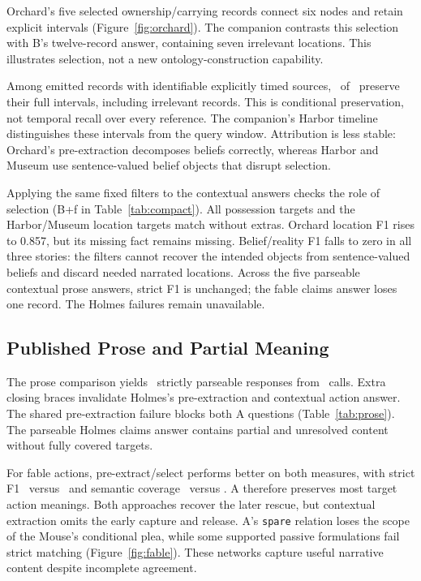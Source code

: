 \documentclass[a4paper,twoside]{article}
\begin{document}


Orchard's five selected ownership/carrying records connect six nodes and retain explicit intervals (Figure~\ref{fig:orchard}). The companion contrasts this selection with B's twelve-record answer, containing seven irrelevant locations. This illustrates selection, not a new ontology-construction capability.

Among emitted records with identifiable explicitly timed sources, \IntervalsKept\ of \IntervalsEligible\ preserve their full intervals, including irrelevant records. This is conditional preservation, not temporal recall over every reference. The companion's Harbor timeline distinguishes these intervals from the query window. Attribution is less stable: Orchard's pre-extraction decomposes beliefs correctly, whereas Harbor and Museum use sentence-valued belief objects that disrupt selection.

Applying the same fixed filters to the contextual answers checks the role of selection (B+f in Table~\ref{tab:compact}). All possession targets and the Harbor/Museum location targets match without extras. Orchard location F1 rises to 0.857, but its missing fact remains missing. Belief/reality F1 falls to zero in all three stories: the filters cannot recover the intended objects from sentence-valued beliefs and discard needed narrated locations. Across the five parseable contextual prose answers, strict F1 is unchanged; the fable claims answer loses one record. The Holmes failures remain unavailable.




\subsection{Published Prose and Partial Meaning}
\noindent The prose comparison yields \ProseParsed\ strictly parseable responses from \ProseCalls\ calls. Extra closing braces invalidate Holmes's pre-extraction and contextual action answer. The shared pre-extraction failure blocks both A questions (Table~\ref{tab:prose}). The parseable Holmes claims answer contains partial and unresolved content without fully covered targets.



For fable actions, pre-extract/select performs better on both measures, with strict F1 \FableAFone\ versus \FableBFone\ and semantic coverage \FableACoverage\ versus \FableBCoverage. A therefore preserves most target action meanings. Both approaches recover the later rescue, but contextual extraction omits the early capture and release. A's \texttt{spare} relation loses the scope of the Mouse's conditional plea, while some supported passive formulations fail strict matching (Figure~\ref{fig:fable}). These networks capture useful narrative content despite incomplete agreement.
\end{document}
